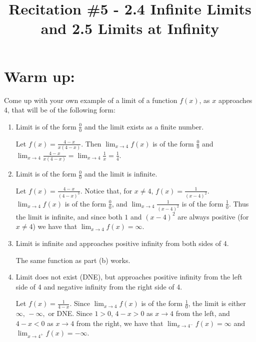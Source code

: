 \documentclass[handout,nooutcomes]{ximera}
\title{Recitation \#5 - 2.4 Infinite Limits and 2.5 Limits at Infinity}
\begin{document}
\begin{abstract}		\end{abstract}
\maketitle

\section*{Warm up:} 
Come up with your own example of a limit of a function $f(x)$, as $x$ approaches 4, that will be of the following form:

	\begin{enumerate}[label=(\alph*)]
	
	\item  Limit is of the form $\frac{0}{0}$ and the limit exists as a finite number.
		\begin{freeResponse}
		Let $f(x) = \frac{4-x}{x(4-x)}$.  Then $\lim_{x \to 4} f(x)$ is of the form $\frac{0}{0}$ and $\lim_{x \to 4} \frac{4-x}{x(4-x)} = \lim_{x \to 4} \frac{1}{x} = \frac{1}{4} $.  
		\end{freeResponse}
	
	
	
	\item  Limit is of the form $\frac{0}{0}$ and the limit is infinite.
		\begin{freeResponse}
		Let $f(x) = \frac{4-x}{(4-x)^3}$.  Notice that, for $x \neq 4$, $f(x) = \frac{1}{(x-4)^2}$.  $\lim_{x \to 4} f(x)$ is of the form $\frac{0}{0}$, and $\lim_{x \to 4} \frac{1}{(x-4)^2} $ is of the form $\frac{1}{0}$.  Thus the limit is infinite, and since both $1$ and $(x-4)^2$ are always positive (for $x \neq 4$) we have that $\lim_{x \to 4} f(x) = \infty $.  		
		\end{freeResponse}
	
	\item  Limit is infinite and approaches positive infinity from both sides of 4.
		\begin{freeResponse}
		 The same function as part (b) works.  
		 \end{freeResponse}
	
	
	
	\item  Limit does not exist (DNE), but approaches positive infinity from the left side of 4 and negative infinity from the right side of 4.
		\begin{freeResponse}  Let $f(x) = \frac{1}{4-x}$.  Since $\lim_{x \to 4} f(x)$ is of the form $\frac{1}{0}$, the limit is either $\infty, \, -\infty, $ or DNE.  Since $1 > 0$, $4-x > 0$ as $x \to 4$ from the left, and $4-x < 0$ as $x \to 4$ from the right, we have that $ \lim_{x \to 4^-} f(x) = \infty  $ and $ \lim_{x \to 4^+} f(x) = - \infty  $.
		\end{freeResponse}
	
	\end{enumerate}
\end{document}
